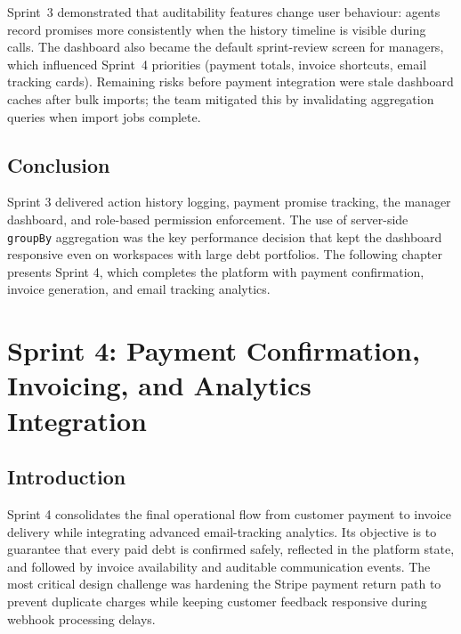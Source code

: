\documentclass[12pt,a4paper]{report}
\begin{document}
Sprint~3 demonstrated that auditability features change user behaviour: agents record promises
more consistently when the history timeline is visible during calls.
The dashboard also became the default sprint-review screen for managers, which influenced
Sprint~4 priorities (payment totals, invoice shortcuts, email tracking cards).
Remaining risks before payment integration were stale dashboard caches after bulk imports;
the team mitigated this by invalidating aggregation queries when import jobs complete.

\section*{Conclusion}
{}

Sprint 3 delivered action history logging, payment promise tracking, the manager
dashboard, and role-based permission enforcement.
The use of server-side \texttt{groupBy} aggregation was the key performance decision
that kept the dashboard responsive even on workspaces with large debt portfolios.
The following chapter presents Sprint 4, which completes the platform with payment
confirmation, invoice generation, and email tracking analytics.

\clearpage
\chapter{Sprint 4: Payment Confirmation, Invoicing, and Analytics Integration}
\label{chap:sprint4}

\section*{Introduction}
{}

Sprint 4 consolidates the final operational flow from customer payment to invoice
delivery while integrating advanced email-tracking analytics.
Its objective is to guarantee that every paid debt is confirmed safely, reflected in
the platform state, and followed by invoice availability and auditable communication
events.
The most critical design challenge was hardening the Stripe payment return path to
prevent duplicate charges while keeping customer feedback responsive during webhook
processing delays.
\end{document}

